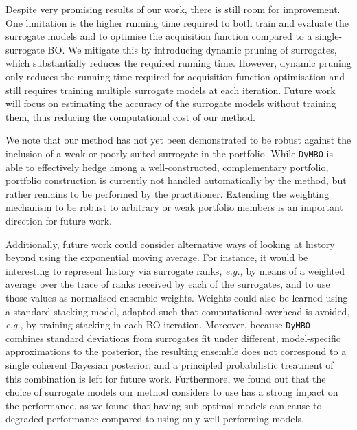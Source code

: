 Despite very promising results of our work, there is still room for improvement.
One limitation is the higher running time required to both train and evaluate the surrogate models and to optimise the acquisition function compared to a single-surrogate BO. %
We mitigate this by introducing dynamic pruning of surrogates, which substantially reduces the required running time.
However, dynamic pruning only reduces the running time required for acquisition function optimisation and still requires training multiple surrogate models at each iteration. Future work will focus on estimating the accuracy of the surrogate models without training them, thus reducing the computational cost of our method.

We  
note that our method has not yet been
demonstrated to be robust against %
the inclusion of a weak or poorly-suited surrogate in the portfolio.
While \texttt{DyMBO} is able to effectively hedge among a well-constructed, complementary portfolio, portfolio construction is currently not handled automatically by the method, but rather remains to be performed by the practitioner.
Extending the weighting mechanism to be robust to arbitrary or weak portfolio members is an important direction for future work.

Additionally, future work could consider alternative ways of looking at history beyond using the exponential moving average. For instance, it would be interesting to represent history via surrogate ranks, \emph{e.g.,} by means of a weighted average over the trace of ranks received by each of the surrogates, and to use those values as normalised ensemble weights.
Weights could also be learned using a standard stacking model, adapted such that computational overhead is avoided, \emph{e.g.},  by training stacking in each BO iteration.
Moreover, because \texttt{DyMBO} combines standard deviations from surrogates fit under different, model-specific approximations to the posterior, the resulting ensemble does not correspond to a single coherent Bayesian posterior, and a principled probabilistic treatment of this combination is left for future work.
Furthermore, we found out that the choice of surrogate models our method considers to use has a strong impact on the performance, as we found that having sub-optimal models can cause to degraded performance compared to using only well-performing models.

